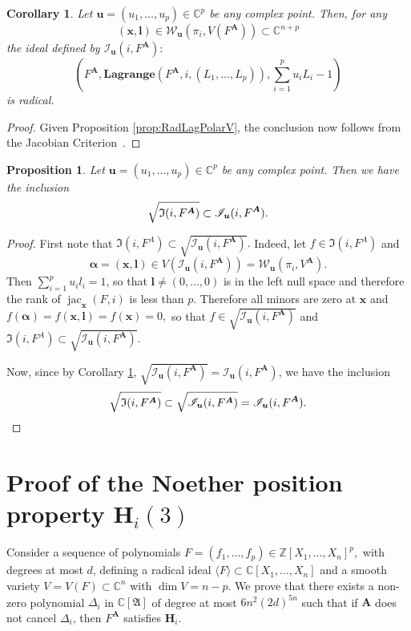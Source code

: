 \documentclass[12pt]{article}
\def\sI{\mathscr{I}}
\def\A{\mathfrak{A}}
\def\mA{{\bm A}}
\def\ub{{\bm u}}
\def\lb{{\bm l}}
\def\xb{{\bm x}}
\def\D{\Delta}
\DeclareMathOperator{\jac}{jac}
\newcommand{\ZZ}{{\mathbb{Z}}}
\def\C{\mathbb{C}}
\def\IiA{\mathfrak{I}(i,F^A)}
\def\lagFA{{\bm{Lagrange}}(F^{\mA},i,(L_1,\hdots,L_p))}
\def\IilA{\mathscr{I}_{\ub}(i,F^{\mA})}
\def\WilA{\mathscr{W}_{\ub}(\pi_i,V^{\mA})}
\newtheorem{corollary}[theorem]{Corollary}
\newtheorem{prop}[theorem]{Proposition}
\begin{document}
    \begin{corollary}\label{cor:LagIdealRadical}
Let $\ub = (u_1,\hdots,u_p) \in \C^p$ be any complex point. Then, for any \[(\xb,\lb)\in \mathscr{W}_{\ub}(\pi_i,V(F^{\mA})) \subset \C^{n+p}\] the ideal defined by $\sI_{\ub}(i,F^{\mA}) :$\[ \left(F^{\mA},\lagFA,\sum_{i=1}^p u_iL_i-1\right)\] is radical.
    \end{corollary}
    \begin{proof}
    Given Proposition \ref{prop:RadLagPolarV}, the conclusion now follows from the Jacobian Criterion~\cite[Corollary 16.20]{ECA}.
    \end{proof}
    \begin{prop}\label{prop:polarVs2}
Let $\ub = (u_1,\hdots,u_p) \in \C^p$ be any complex point. Then we have the inclusion
    \[
    \sqrt{\frak{I}(i,F^{\mA})} \subset \IilA.
    \]
    \end{prop}
    \begin{proof}
    First note that $\IiA \subset \sqrt{\IilA}.$ Indeed, let $f \in \IiA$ and \[\bm \alpha = (\xb,\lb) \in V(\IilA)=\WilA.\] Then $\sum_{i=1}^p u_i l_i = 1$, so that $\lb \not = (0,\hdots,0)$ is in the left null space and therefore the rank of $\jac_{\xb} (F,i)$ is less than $p.$ Therefore all minors are zero at $\xb$ and $f(\bm \alpha)= f(\xb,\lb)=f(\xb)=0,$ so that $f \in \sqrt{\IilA}$ and $\IiA \subset \sqrt{\IilA}.$
    \par 
    Now, since by Corollary \ref{cor:LagIdealRadical}, $\sqrt{\IilA} = \IilA$, we have the inclusion
    \[
    \sqrt{\frak{I}(i,F^{\mA})} \subset \sqrt{\IilA} = \IilA.
    \]
    \end{proof}

















\section{Proof of the Noether position property $\textbf{H}_i(3)$}\label{ssec:Hi2}


Consider a sequence of polynomials $F= (f_1,\hdots,f_p) \in \ZZ[X_1,\hdots,X_n]^p,$ with degrees at most $d$, defining a radical ideal $\langle F \rangle \subset \C[X_1,\hdots,X_n]$ and a smooth variety $V=V(F) \subset \C^n$ with $\dim V = n-p$. We prove that there exists a non-zero polynomial $\D_{i}$ in $\C[\A]$ of degree at most $6n^2(2d)^{5n}$ such that if $\mA$ does not cancel $\D_{i}$, then $F^{\mA}$ satisfies  $\bm H_i$.
\end{document}
